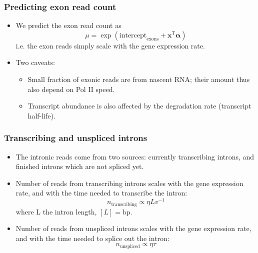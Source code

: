 \documentclass{beamer}
\begin{document}
	
	\begin{frame}
		\frametitle{Predicting exon read count}	
		\pause
		\begin{itemize}
			\item We predict the exon read count as
			$$
			\mu =  \exp \left( \text{intercept}_{\text{exons}} + \mathbf{x}^\mathsf{T} \boldsymbol{\alpha} \right)
			$$ 
			i.e. the exon reads simply scale with the gene expression rate.
			\pause
			\item Two caveats:
			\begin{itemize}
				\item Small fraction of exonic reads are from nascent RNA; their amount thus also depend on Pol II speed. 
				\pause
				
				\item Transcript abundance is also affected by the degradation rate (transcript half-life).
			\end{itemize}
		\end{itemize}
		\end{frame}
		
	\begin{frame}
		\frametitle{Transcribing and unspliced introns}	
		\pause
		\begin{itemize}
			\item The intronic reads come from two sources: currently transcribing introns, and finished introns which are not spliced yet.
			\pause
			\item Number of reads from transcribing introns scales with the gene expression rate, and with the time needed to transcribe the intron:
			$$
			n_{\text{transcribing}} \propto \eta L v^{-1}
			$$
			where L the intron length, $\left[ L \right] = \mathrm{bp}$.
			\pause
			\item Number of reads from unspliced introns scales with the gene expression rate, and with the time needed to splice out the intron:
			$$
			n_{\text{unspliced}} \propto \eta \tau
			$$
			
		\end{itemize}
	\end{frame}
	
\end{document}
